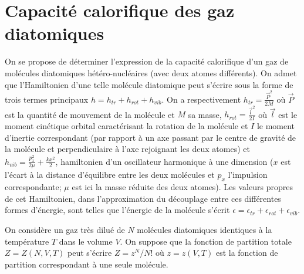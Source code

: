 \documentclass[utf8, 11pt]{feuille}
\begin{document}
\section{Capacité calorifique des gaz diatomiques}

On se propose de déterminer l'expression de la capacité calorifique d'un gaz de molécules diatomiques  hétéro-nucléaires (avec deux atomes différents). On admet que l'Hamiltonien d'une telle molécule diatomique peut s'écrire sous la forme de trois termes principaux $h = h_{tr} + h_{rot} + h_{vib}$. On a respectivement $h_{tr} =\frac{\vec{P}^2}{2M}$ où $\vec{P}$ est la quantité de mouvement de la molécule et $M$ sa masse, $h_{rot} =\frac{\vec{l}^2}{2I}$ où $\vec{l}$ est le moment cinétique orbital caractérisant la rotation de la molécule et $I$ le moment d'inertie correspondant (par rapport à  un axe passant par le centre de gravité de la molécule et perpendiculaire à  l'axe rejoignant les deux atomes) et $h_{vib} =\frac{p_x^2}{2\mu}+\frac{k x^2}{2}$, hamiltonien d'un oscillateur harmonique à  une dimension ($x$ est l'écart à  la distance d'équilibre entre les deux molécules et $p_x$ l'impulsion correspondante; $\mu$ est ici la masse réduite des deux atomes).
Les valeurs propres de cet Hamiltonien, dans l'approximation du découplage entre ces différentes formes d'énergie, sont telles que l'énergie de la molécule s'écrit $\epsilon =\epsilon_{tr}+\epsilon_{rot}+\epsilon_{vib}$.

On considère un gaz très dilué de $N$ molécules diatomiques identiques à  la température $T$ dans le volume $V$. On suppose que la fonction de partition totale $Z=Z(N,V,T)$ peut s'écrire $Z= z^N/N!$ où $z=z(V,T)$ est la fonction de partition correspondant à  une seule molécule.




\end{document}
